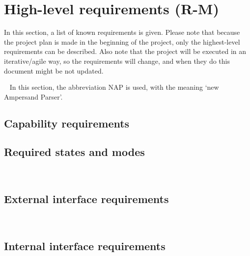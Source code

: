 \section{High-level requirements (R-M)}
\label{sec:requirements}
In this section, a list of known requirements is given.
Please note that because the project plan is made in the beginning of the project, only the highest-level requirements can be described.
Also note that the project will be executed in an iterative/agile way, so the requirements will change, and when they do this document might be not updated.

~\newline\noindent
In this section, the abbreviation NAP is used, with the meaning `new Ampersand Parser'.
%

\subsection{Capability requirements}

\subsection{Required states and modes}
\\


\subsection{External interface requirements}
\\


\subsection{Internal interface requirements}

